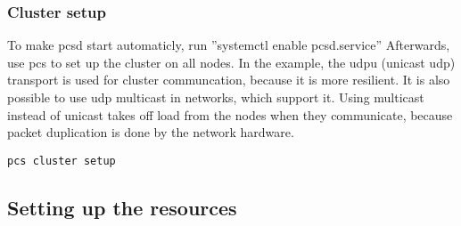 \subsubsection{Cluster setup}
To make pcsd start automaticly, run ''systemctl enable pcsd.service''
Afterwards, use pcs to set up the cluster on all nodes. 
In the example, the udpu (unicast udp) transport is used for cluster communcation, because it is more resilient.
It is also possible to use udp multicast in networks, which support it. Using multicast
instead of unicast takes off load from the nodes when they communicate, because packet duplication is done by the network hardware.
\begin{lstlisting}
pcs cluster setup
\end{lstlisting}
\subsection{Setting up the resources}

